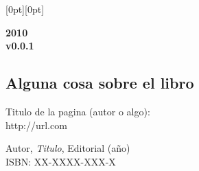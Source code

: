 \documentclass[12pt]{book}
\newlength{\PictHOffset}
\newlength{\PictVOffset}
\begin{document}
\begin{titlepage}
   \noindent\hspace*{-\PictHOffset}%
   \raisebox{\PictVOffset}[0pt][0pt]{}

   \begin{center}
      \vfill
      \bfseries \Huge 2010 \\[3cm]
      \vfill
     v0.0.1
   \end{center}
\end{titlepage}

\thispagestyle{empty}
\subsection*{\center \normalsize Alguna cosa sobre el libro}
 
\tableofcontents 
\mainmatter


 
\begin{thebibliography}{99}
  
Titulo de la pagina (autor o algo): \\
http://url.com
 
Autor, \emph{Titulo}, Editorial (año) \\
ISBN: XX-XXXX-XXX-X
 
\end{thebibliography}
 
\end{document}
